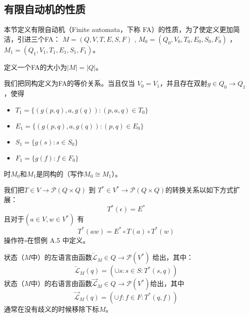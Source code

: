 \subsection{有限自动机的性质}

本节定义有限自动机（Finite automata，下称 FA）的性质，为了使定义更加简洁，引进三个FA： $M=(Q,V,T,E,S,F)$ , $M_0=(Q_0,V_0,T_0,E_0,S_0,F_0)$ ， $ M_1=(Q_1,V_1,T_1,E_1,S_1,F_1) $。

\begin{definition}[FA 的大小]
    定义一个FA的大小为$|M|=|Q|$。
\end{definition}

\begin{definition}\label{def:isom}
    我们把同构定义为FA的等价关系。当且仅当 $V_0=V_1$，并且存在双射$g\in Q_0 \longrightarrow Q_1$ ，使得
\begin{itemize}
    \item $T_1 = \{ (g(p,q),a,g(q)) : (p,a,q) \in T_0 \}$
    \item $E_1 = \{ (g(p,q),a,g(q)) : (p,q) \in E_0\}$
    \item $S_1 = \{ g(s):s\in S_0 \}$
    \item $F_1 = \{ g(f):f\in F_0 \}$
\end{itemize}
时$M_0$和$M_1$是同构的（写作$M_0 \cong M_1$）。
\end{definition}

\begin{definition}
    我们把$T \in V \longrightarrow \mathcal{P} (Q \times Q) $ 到 $ T^* \in V^* \longrightarrow \mathcal{P} (Q \times Q)  $的转换关系以如下方式扩展： 
    \[ 
        T^*(\epsilon) = E^* 
    \]
    且对于$(a\in V,w\in V^*)$ 有 
    \[ 
        T^*(aw) = E^* \circ T(a) \circ T^*(w)    
    \]
    操作符$\circ$在惯例 A.5 中定义。
\end{definition}

\begin{definition}
    状态（$M$中）的左语言由函数$ \overleftarrow{\mathcal{L}} _M \in Q \longrightarrow \mathcal{P}(V^*)$ 给出，其中：
    \[ 
        \overleftarrow{\mathcal{L}}_M (q) = ( \cup s:s \in S : T^*(s,q) )  
    \] 
    状态（$M$中）的右语言由函数$ \overrightarrow{\mathcal{L}} _M \in Q \longrightarrow \mathcal{P}(V^*)$给出，其中 
    \[ 
        \overrightarrow{\mathcal{L}}_M (q) = ( \cup f:f \in F : T^*(q,f) ) 
    \] 
    通常在没有歧义的时候移除下标$M$。
\end{definition}

